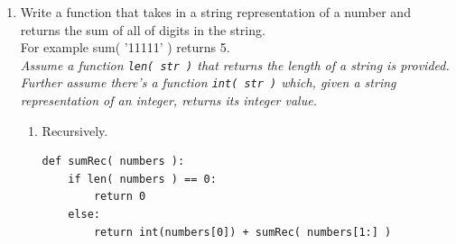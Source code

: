 \documentclass[11pt]{article}
\newenvironment{answer}{\large\lstset{basicstyle=\large}\color{white}}{}
\newenvironment{answer}{\large\lstset{basicstyle=\large}\color{red}}{}
\begin{document}
\begin{enumerate}
    \item Write a function that takes in a string representation of a number and returns the sum
        of all of digits in the string. \\For example sum( '11111' ) returns 5. \\
        \emph{Assume a function \texttt{len( str )} that returns the length of a string is provided. \\
         Further assume there's a function \texttt{int( str )} which, given a string representation of an integer, returns its integer value.}

        \begin{enumerate}
            \item Recursively.
\begin{answer}
\begin{lstlisting}
def sumRec( numbers ):
    if len( numbers ) == 0:
        return 0
    else:
        return int(numbers[0]) + sumRec( numbers[1:] )
\end{lstlisting}
\end{answer}


\end{enumerate}
\end{enumerate}
\end{document}
